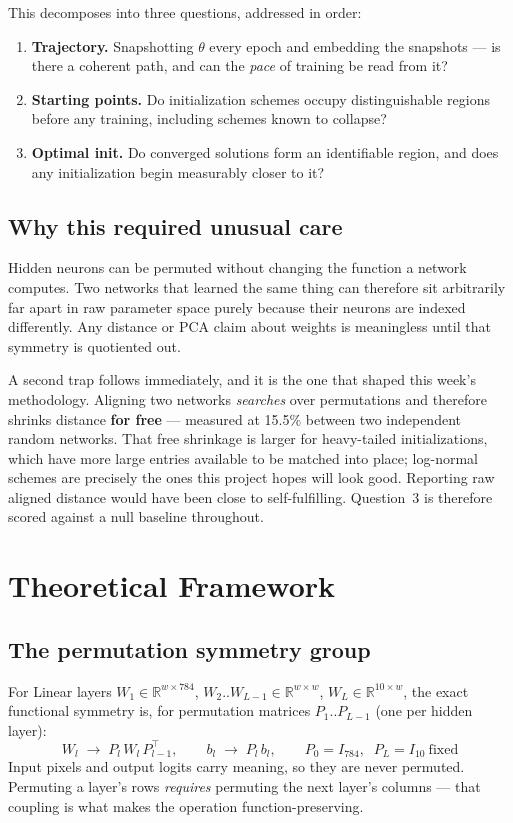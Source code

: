 \documentclass[11pt]{article}
\begin{document}
This decomposes into three questions, addressed in order:

\begin{enumerate}
\item \textbf{Trajectory.} Snapshotting $\theta$ every epoch and embedding the snapshots --- is
there a coherent path, and can the \emph{pace} of training be read from it?
\item \textbf{Starting points.} Do initialization schemes occupy distinguishable regions before
any training, including schemes known to collapse?
\item \textbf{Optimal init.} Do converged solutions form an identifiable region, and does any
initialization begin measurably closer to it?
\end{enumerate}

\subsection{Why this required unusual care}

Hidden neurons can be permuted without changing the function a network computes. Two networks
that learned the same thing can therefore sit arbitrarily far apart in raw parameter space purely
because their neurons are indexed differently. Any distance or PCA claim about weights is
meaningless until that symmetry is quotiented out.

A second trap follows immediately, and it is the one that shaped this week's methodology.
Aligning two networks \emph{searches} over permutations and therefore shrinks distance
\textbf{for free} --- measured at 15.5\% between two independent random networks. That free
shrinkage is larger for heavy-tailed initializations, which have more large entries available to
be matched into place; log-normal schemes are precisely the ones this project hopes will look
good. Reporting raw aligned distance would have been close to self-fulfilling. Question~3 is
therefore scored against a null baseline throughout.

\section{Theoretical Framework}

\subsection{The permutation symmetry group}

For Linear layers $W_1\in\mathbb{R}^{w\times784}$, $W_2..W_{L-1}\in\mathbb{R}^{w\times w}$,
$W_L\in\mathbb{R}^{10\times w}$, the exact functional symmetry is, for permutation matrices
$P_1..P_{L-1}$ (one per hidden layer):
\begin{equation}
W_l \;\rightarrow\; P_l\,W_l\,P_{l-1}^{\top}, \qquad b_l \;\rightarrow\; P_l\,b_l,
\qquad P_0 = I_{784},\;\; P_L = I_{10}\ \text{fixed}
\end{equation}
Input pixels and output logits carry meaning, so they are never permuted. Permuting a layer's
rows \emph{requires} permuting the next layer's columns --- that coupling is what makes the
operation function-preserving.
\end{document}
